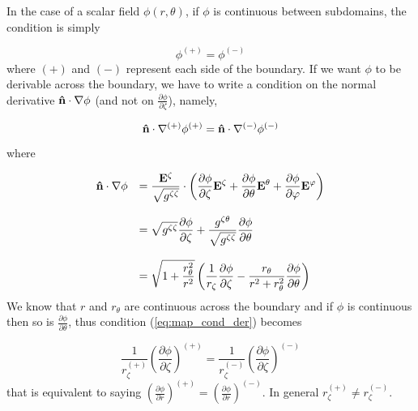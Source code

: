 In the case of a scalar field $\phi(r,\theta)$, if $\phi$ is continuous
between subdomains, the condition is simply

\begin{equation}
\phi^{(+)}=\phi^{(-)}
\end{equation}
where $(+)$ and $(-)$ represent each side of the boundary. If we want
$\phi$ to be derivable across the boundary, we have to write a condition
on the normal derivative $\mathbf{\hat n}\cdot\nabla\phi$ (and not on
$\frac{\partial\phi}{\partial\zeta}$), namely,

\begin{equation}
\label{eq:map_cond_der}
\mathbf{\hat n}\cdot\nabla^{(+)}\phi^{(+)}=\mathbf{\hat n}\cdot\nabla^{(-)}\phi^{(-)}
\end{equation}
where 

\begin{equation}
\begin{array}{rl}
\mathbf{\hat n}\cdot\nabla\phi&
\displaystyle =\frac{\mathbf{E}^\zeta}{\sqrt{g^{\zeta\zeta}}}\cdot\left(\frac{\partial\phi}{\partial\zeta}\mathbf{E}^\zeta+
\frac{\partial\phi}{\partial\theta}\mathbf{E}^\theta+\frac{\partial\phi}{\partial\varphi}\mathbf{E}^\varphi\right)\\
&\\&
\displaystyle =\sqrt{g^{\zeta\zeta}}\frac{\partial\phi}{\partial\zeta}+\frac{g^{\zeta\theta}}{\sqrt{g^{\zeta\zeta}}}
\frac{\partial\phi}{\partial\theta}\\
&\\&
\displaystyle =\sqrt{1+\frac{r_\theta^2}{r^2}}\left(\frac{1}{r_\zeta}\frac{\partial\phi}{\partial\zeta}-
\frac{r_\theta}{r^2+r_\theta^2}\frac{\partial\phi}{\partial\theta}\right)
\end{array}
\end{equation}
We know that $r$ and $r_\theta$ are continuous across the boundary and
if $\phi$ is continuous then so is $\frac{\partial\phi}{\partial\theta}$,
thus condition (\ref{eq:map_cond_der}) becomes

\begin{equation}
\frac{1}{r_\zeta^{(+)}}\left(\frac{\partial\phi}{\partial\zeta}\right)^{(+)}=
\frac{1}{r_\zeta^{(-)}}\left(\frac{\partial\phi}{\partial\zeta}\right)^{(-)}
\end{equation}
that is equivalent to saying
$\displaystyle\left(\frac{\partial\phi}{\partial r}\right)^{(+)}=
\left(\frac{\partial\phi}{\partial r}\right)^{(-)}$. In general
$r_\zeta^{(+)}\neq r_\zeta^{(-)}$.


